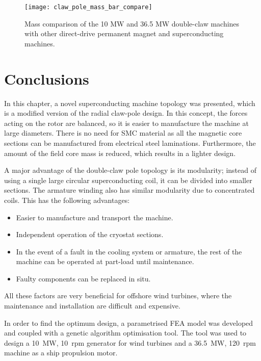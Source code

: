 \documentclass[final,peerreview,onecolumn]{IEEEtran}
\begin{document}
\begin{figure}[ht]
  \centering
    \texttt{[image: claw\_pole\_mass\_bar\_compare]}
  \caption{Mass comparison of the 10 MW and 36.5 MW double-claw machines with other direct-drive permanent magnet and  superconducting machines.}
  \label{claw_pole_mass_compare}
\end{figure}

\section{Conclusions}

In this chapter, a novel superconducting machine topology was presented, which is a modified version of the radial claw-pole design. In this concept, the forces acting on the rotor  are balanced, so it is easier to manufacture the machine at large diameters. There is no need for SMC material as all the magnetic core sections can be manufactured from electrical steel laminations. Furthermore, the amount of the field core mass is reduced, which results in a lighter design.

A major advantage of the double-claw pole topology is its modularity; instead of using a single large circular superconducting coil, it can be divided into smaller sections. The armature winding also has similar modularity due to concentrated coils. This has the following advantages:

\begin{itemize}
  \item Easier to manufacture and transport the machine.
  \item Independent operation of the cryostat sections.
  \item In the event of a fault in the cooling system or armature, the rest of the machine can be operated at part-load until maintenance.
  \item Faulty components can be replaced in situ.
\end{itemize}

All these factors are very beneficial for offshore wind turbines, where the maintenance and installation are difficult and expensive.

In order to find the optimum design, a parametrised FEA model was developed and coupled with a genetic algorithm optimisation tool. The tool was used to design a 10~MW, 10~rpm generator for wind turbines and a 36.5~MW, 120~rpm machine as a ship propulsion motor.
\end{document}
